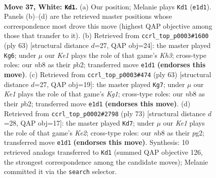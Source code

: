 \documentclass[11pt]{article}
\begin{document}
\clearpage

\begin{figure}[p]\centering
\begin{subfigure}{0.46\textwidth}\centering
\resizebox{\linewidth}{!}{%
\newchessgame
\chessboard[
  setfen={1n4r1/5k2/1p1p4/1P1P4/p1p3P1/7P/1P5R/4K3 w - - 3 37},
  showmover=false,
  pgfstyle=straightmove, color=movearrow, markmove={e1-d1}
]}
\caption{}
\end{subfigure}\hfill
\begin{subfigure}{0.46\textwidth}\centering
\resizebox{\linewidth}{!}{%
\newchessgame
\chessboard[
  setfen={8/1r2p3/3p3k/3P2p1/1p2R3/5P2/KPP5/8 b - - 1 32},
  showmover=false,
  pgfstyle=straightmove, color=movearrow, markmove={h6-g6}
]}
\caption{}
\end{subfigure}
\\[4pt]
\begin{subfigure}{0.46\textwidth}\centering
\resizebox{\linewidth}{!}{%
\newchessgame
\chessboard[
  setfen={r5k1/5p2/4p2p/1R4p1/p7/5PP1/PP5P/4K3 b - - 1 32},
  showmover=false,
  pgfstyle=straightmove, color=movearrow, markmove={g8-g7}
]}
\caption{}
\end{subfigure}\hfill
\begin{subfigure}{0.46\textwidth}\centering
\resizebox{\linewidth}{!}{%
\newchessgame
\chessboard[
  setfen={1r6/p3kp2/P5p1/2R4p/1p1P4/4P3/1P4P1/6K1 b - - 2 37},
  showmover=false,
  pgfstyle=straightmove, color=movearrow, markmove={e7-d7}
]}
\caption{}
\end{subfigure}
\caption{\textbf{Move 37, White: \texttt{Kd1}.} (a) Our position; Melanie plays \texttt{Kd1} (\texttt{e1d1}). Panels (b)--(d) are the retrieved master positions whose correspondence most drove this move (highest QAP objective among those that transfer to it). (b) Retrieved from \texttt{ccrl\_top\_p0003\#1600} (ply 63) [structural distance $d$=27, QAP obj=24]: the master played \texttt{Kg6}; under $\mu$ our \emph{Ke1} plays the role of that game's \emph{Kh3}; cross-type roles: our \emph{n}b8 as their \emph{p}b2; transferred move \texttt{e1d1} \textbf{(endorses this move)}. (c) Retrieved from \texttt{ccrl\_top\_p0003\#474} (ply 63) [structural distance $d$=27, QAP obj=19]: the master played \texttt{Kg7}; under $\mu$ our \emph{Ke1} plays the role of that game's \emph{Kg1}; cross-type roles: our \emph{n}b8 as their \emph{p}b2; transferred move \texttt{e1d1} \textbf{(endorses this move)}. (d) Retrieved from \texttt{ccrl\_top\_p0002\#2798} (ply 73) [structural distance $d$=28, QAP obj=17]: the master played \texttt{Kd7}; under $\mu$ our \emph{Ke1} plays the role of that game's \emph{Ke2}; cross-type roles: our \emph{n}b8 as their \emph{p}g2; transferred move \texttt{e1d1} \textbf{(endorses this move)}. Synthesis: 10 retrieved analogs transferred to \texttt{Kd1} (summed QAP objective 126, the strongest correspondence among the candidate moves); Melanie committed it via the \texttt{search} selector.}
\label{fig:thought-m72}
\end{figure}
\end{document}
